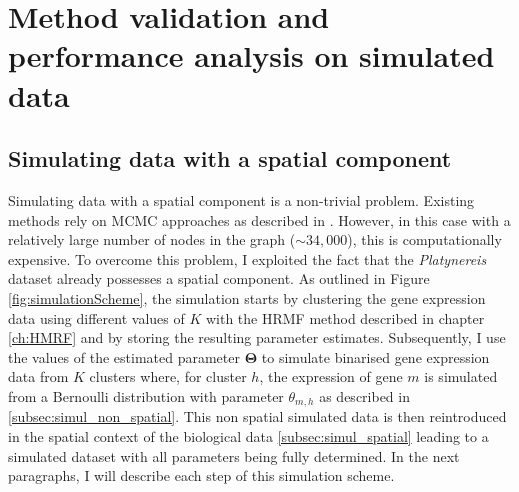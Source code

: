\chapter{Method validation and performance analysis on simulated data}\label{ch:simulations} 

\section{Simulating data with a spatial component }
Simulating data with a spatial component is a non-trivial problem. Existing methods rely on MCMC approaches as described in \cite{Chalmond89}. However, in this case with a relatively large number of nodes in the graph ($\sim 34,000$), this is computationally expensive. To overcome this problem, I exploited the fact that the {\it{Platynereis}} dataset already possesses a spatial component. As outlined in Figure \ref{fig:simulationScheme}, the simulation starts by clustering the gene expression data using different values of $K$ with the HRMF method described in chapter \ref{ch:HMRF} and by storing the resulting parameter estimates. Subsequently, I use the values of the estimated parameter $\boldsymbol{\Theta}$ to simulate binarised gene expression data from $K$ clusters where, for cluster $h$, the expression of gene $m$ is simulated from a Bernoulli distribution with parameter $\theta_{m,h}$ as described in \ref{subsec:simul_non_spatial}. This non spatial simulated data is then reintroduced in the spatial context of the biological data \ref{subsec:simul_spatial} leading to a simulated dataset with all parameters being fully determined. In the next paragraphs, I will describe each step of this simulation scheme.

